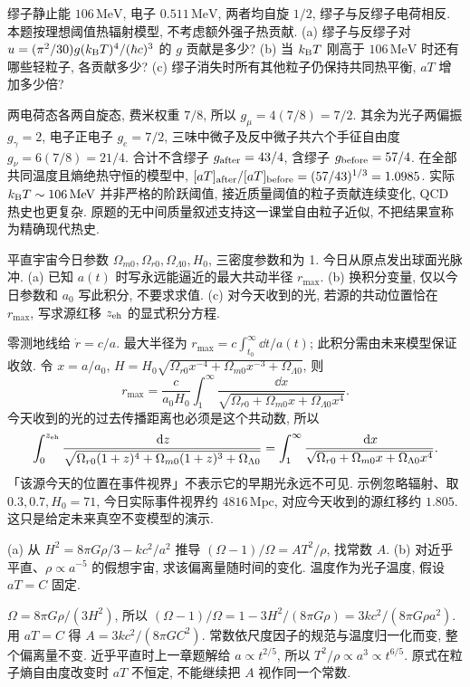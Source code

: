 \begin{exercise}
缪子静止能 $106\,\mathrm{MeV}$, 电子 $0.511\,\mathrm{MeV}$, 两者均自旋 $1/2$, 缪子与反缪子电荷相反. 本题按理想阈值热辐射模型, 不考虑额外强子热贡献.
(a) 缪子与反缪子对 $u=(\pi^2/30)g(k_{\mathrm B} T)^4/(\hbar c)^3$ 的 $g$ 贡献是多少?
(b) 当 $k_{\mathrm B} T$ 刚高于 $106\,\mathrm{MeV}$ 时还有哪些轻粒子, 各贡献多少?
(c) 缪子消失时所有其他粒子仍保持共同热平衡, $aT$ 增加多少倍?
\end{exercise}
\begin{solution}
两电荷态各两自旋态, 费米权重 $7/8$, 所以 $g_\mu=4(7/8)=7/2$. 其余为光子两偏振 $g_\gamma=2$, 电子正电子 $g_e=7/2$, 三味中微子及反中微子共六个手征自由度 $g_\nu=6(7/8)=21/4$. 合计不含缪子 $g_{
\rm after}=43/4$, 含缪子 $g_{\rm before}=57/4$. 在全部共同温度且熵绝热守恒的模型中,
$[aT]_{\rm after}/[aT]_{\rm before}=(57/43)^{1/3}=1.0985$.
实际 $k_{\mathrm B} T\sim106\,\mathrm{MeV}$ 并非严格的阶跃阈值, 接近质量阈值的粒子贡献连续变化, QCD 热史也更复杂. 原题的无中间质量叙述支持这一课堂自由粒子近似, 不把结果宣称为精确现代热史.
\end{solution}

\begin{exercise}
平直宇宙今日参数 $\Omega_{m0},\Omega_{r0},\Omega_{\Lambda0},H_0$, 三密度参数和为 1. 今日从原点发出球面光脉冲.
(a) 已知 $a(t)$ 时写永远能逼近的最大共动半径 $r_{\max}$.
(b) 换积分变量, 仅以今日参数和 $a_0$ 写此积分, 不要求求值.
(c) 对今天收到的光, 若源的共动位置恰在 $r_{\max}$, 写求源红移 $z_{\rm eh}$ 的显式积分方程.
\end{exercise}
\begin{solution}
零测地线给 $\dot r=c/a$. 最大半径为 $r_{\max}=c\int_{t_0}^\infty\dd t/a(t)$; 此积分需由未来模型保证收敛. 令 $x=a/a_0$, $H=H_0\sqrt{\Omega_{r0}x^{-4}+\Omega_{m0}x^{-3}+\Omega_{\Lambda0}}$, 则
\[
r_{\max}=\frac c{a_0H_0}\int_1^\infty
\frac{\dd x}{\sqrt{\Omega_{r0}+\Omega_{m0}x+\Omega_{\Lambda0}x^4}}.
\]
今天收到的光的过去传播距离也必须是这个共动数, 所以
\[
\int_0^{z_{\rm eh}}\frac{\,\mathrm d z}{\sqrt{\Omega_{r0}(1+z)^4+\Omega_{m0}(1+z)^3+\Omega_{\Lambda0}}}
=\int_1^\infty\frac{\,\mathrm d x}{\sqrt{\Omega_{r0}+\Omega_{m0}x+\Omega_{\Lambda0}x^4}}.
\]
「该源今天的位置在事件视界」不表示它的早期光永远不可见. 示例忽略辐射、取 $0.3,0.7,H_0=71$, 今日实际事件视界约 $4816\,\mathrm{Mpc}$, 对应今天收到的源红移约 $1.805$. 这只是给定未来真空不变模型的演示.
\end{solution}

\begin{exercise}
(a) 从 $H^2=8\pi G\rho/3-kc^2/a^2$ 推导 $(\Omega-1)/\Omega=A T^2/\rho$, 找常数 $A$.
(b) 对近乎平直、$\rho\propto a^{-5}$ 的假想宇宙, 求该偏离量随时间的变化. 温度作为光子温度, 假设 $aT=C$ 固定.
\end{exercise}
\begin{solution}
$\Omega=8\pi G\rho/(3H^2)$, 所以 $(\Omega-1)/\Omega=1-3H^2/(8\pi G\rho)=3kc^2/(8\pi G\rho a^2)$. 用 $aT=C$ 得 $A=3kc^2/(8\pi GC^2)$. 常数依尺度因子的规范与温度归一化而变, 整个偏离量不变. 近乎平直时上一章题解给 $a\propto t^{2/5}$, 所以 $T^2/\rho\propto a^3\propto t^{6/5}$. 原式在粒子熵自由度改变时 $aT$ 不恒定, 不能继续把 $A$ 视作同一个常数.
\end{solution}
